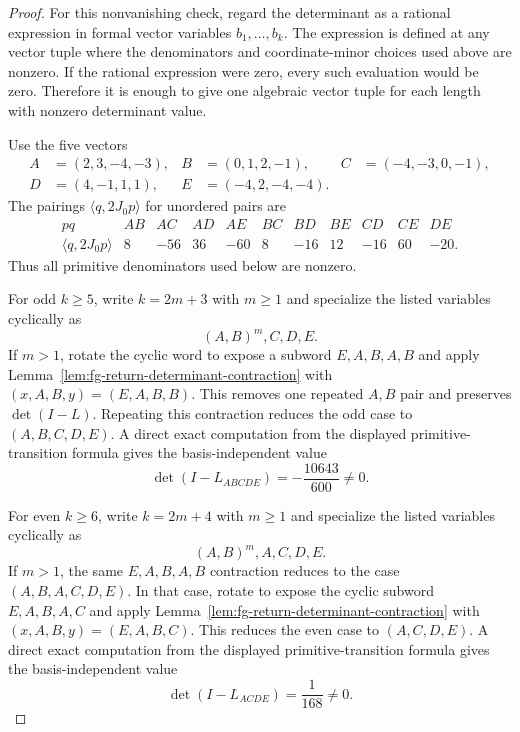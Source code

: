 \begin{unverified}
\begin{proof}
For this nonvanishing check, regard the determinant as a rational expression
in formal vector variables \(b_1,\ldots,b_k\).  The expression is defined at
any vector tuple where the denominators and coordinate-minor choices used above
are nonzero.  If the rational expression were zero, every such evaluation would
be zero.  Therefore it is enough to give one algebraic vector tuple for each
length with nonzero determinant value.

Use the five vectors
\[
\begin{aligned}
 A&=(2,3,-4,-3),&
 B&=(0,1,2,-1),&
 C&=(-4,-3,0,-1),\\
 D&=(4,-1,1,1),&
 E&=(-4,2,-4,-4).
\end{aligned}
\]
The pairings \(\langle q,2J_0p\rangle\) for unordered pairs are
\[
\begin{array}{c|cccccccccc}
pq&AB&AC&AD&AE&BC&BD&BE&CD&CE&DE\\ \hline
\langle q,2J_0p\rangle
&8&-56&36&-60&8&-16&12&-16&60&-20 .
\end{array}
\]
Thus all primitive denominators used below are nonzero.

For odd \(k\ge5\), write \(k=2m+3\) with \(m\ge1\) and specialize the listed
variables cyclically as
\[
  (A,B)^m,C,D,E .
\]
If \(m>1\), rotate the cyclic word to expose a subword \(E,A,B,A,B\) and apply
Lemma~\ref{lem:fg-return-determinant-contraction} with
\((x,A,B,y)=(E,A,B,B)\).  This removes one repeated \(A,B\) pair and preserves
\(\det(I-L)\).  Repeating this contraction reduces the odd case to
\((A,B,C,D,E)\).  A direct exact computation from the displayed
primitive-transition formula gives the basis-independent value
\[
  \det(I-L_{ABCDE})=-\frac{10643}{600}\ne0 .
\]

For even \(k\ge6\), write \(k=2m+4\) with \(m\ge1\) and specialize the listed
variables cyclically as
\[
  (A,B)^m,A,C,D,E .
\]
If \(m>1\), the same \(E,A,B,A,B\) contraction reduces to the case
\((A,B,A,C,D,E)\).  In that case, rotate to expose the cyclic subword
\(E,A,B,A,C\) and apply
Lemma~\ref{lem:fg-return-determinant-contraction} with
\((x,A,B,y)=(E,A,B,C)\).  This reduces the even case to \((A,C,D,E)\).  A
direct exact computation from the displayed primitive-transition formula gives
the basis-independent value
\[
  \det(I-L_{ACDE})=\frac{1}{168}\ne0 .
\]


\end{proof}
\end{unverified}
